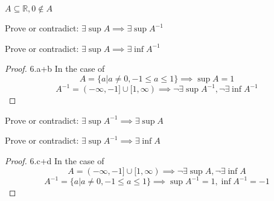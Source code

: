 \documentclass[12pt]{article}
\newenvironment{problem}[2][Problem]{\begin{trivlist}
\item[\hskip \labelsep {\bfseries #1}\hskip \labelsep {\bfseries #2.}]}{\end{trivlist}}
\begin{document}
\begin{problem}{6}
	$A \subseteq \mathbb{R}, 0 \notin A$

\begin{problem}{6.a}
	Prove or contradict: $\exists \sup A \implies \exists \sup A^{-1}$
\end{problem}

\begin{problem}{6.b}
	Prove or contradict: $\exists \sup A \implies \exists \inf A^{-1}$
\end{problem}

\begin{proof}{6.a+b}
	In the case of $$A = \{a | a \ne 0, -1 \le a \le 1\} \implies \sup A = 1 $$
	$$ A^{-1} = (-\infty, -1] \cup [1,\infty) \implies \lnot \exists \sup A^{-1}, \lnot \exists \inf A^{-1}$$
\end{proof}

\begin{problem}{6.c}
	Prove or contradict: $\exists \sup A^{-1} \implies \exists \sup A$
\end{problem}

\begin{problem}{6.d}
	Prove or contradict: $\exists \sup A^{-1} \implies \exists \inf A$
\end{problem}

\begin{proof}{6.c+d}
	In the case of $$A = (-\infty, -1] \cup [1,\infty) \implies \lnot \exists \sup A, \lnot \exists \inf A$$
	$$ A^{-1} = \{a | a \ne 0, -1 \le a \le 1\} \implies \sup A^{-1} = 1, \inf A^{-1} = -1$$
\end{proof}



\end{problem}
\end{document}
